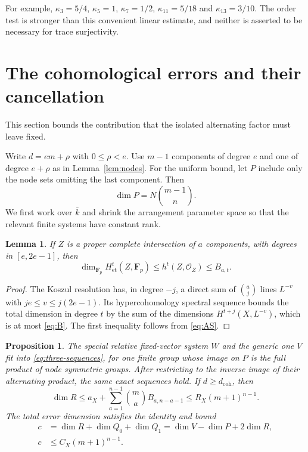 \documentclass[11pt]{article}
\newtheorem{proposition}[theorem]{Proposition}
\newtheorem{lemma}[theorem]{Lemma}
\theoremstyle{remark}\newtheorem{remark}[theorem]{Remark}
\newcommand{\OO}{\mathcal O}
\newcommand{\FF}{\mathbf F}
\newcommand{\et}{\mathrm{et}}
\begin{document}
For example, $\kappa_3=5/4$, $\kappa_5=1$, $\kappa_7=1/2$, $\kappa_{11}=5/18$ and $\kappa_{13}=3/10$. The order test is stronger than this convenient linear estimate, and neither is asserted to be necessary for trace surjectivity.

\section{The cohomological errors and their cancellation}\label{sec:errors}

This section bounds the contribution that the isolated alternating factor must leave fixed.

Write $d=em+\rho$ with $0\le\rho<e$. Use $m-1$ components of degree $e$ and one of degree $e+\rho$ as in Lemma~\ref{lem:nodes}. For the uniform bound, let $P$ include only the node sets omitting the last component. Then
\begin{equation}\label{eq:P-dimension}
                       \dim P=N\binom{m-1}{n}.
\end{equation}
We first work over $\bar k$ and shrink the arrangement parameter space so that the relevant finite systems have constant rank.

\begin{lemma}\label{lem:koszul}
If $Z$ is a proper complete intersection of $a$ components, with degrees in $[e,2e-1]$, then
\[
              \dim_{\FF_p}H^t_{\et}(Z,\FF_p)\le h^t(Z,\OO_Z)\le B_{a,t}.
\]
\end{lemma}

\begin{proof}
The Koszul resolution has, in degree $-j$, a direct sum of $\binom aj$ lines $L^{-v}$ with $je\le v\le j(2e-1)$. Its hypercohomology spectral sequence bounds the total dimension in degree $t$ by the sum of the dimensions $H^{t+j}(X,L^{-v})$, which is at most \eqref{eq:B}. The first inequality follows from \eqref{eq:AS}.
\end{proof}

\begin{proposition}\label{prop:errors}
The special relative fixed-vector system $W$ and the generic one $V$ fit into \eqref{eq:three-sequences}, for one finite group whose image on $P$ is the full product of node symmetric groups. After restricting to the inverse image of their alternating product, the same exact sequences hold. If $d\ge d_{\mathrm{coh}}$, then
\begin{equation}\label{eq:R-bound}
 \dim R\le a_X+\sum_{a=1}^{n-1}\binom ma B_{a,n-a-1}
                            \le R_X(m+1)^{n-1}.
\end{equation}
The total error dimension satisfies the identity and bound
\begin{equation}\label{eq:error-cancellation}
 \begin{split}
 c&=\dim R+\dim Q_0+\dim Q_1
       =\dim V-\dim P+2\dim R,\\
 c&\le C_X(m+1)^{n-1}.
 \end{split}
\end{equation}
\end{proposition}
\end{document}
